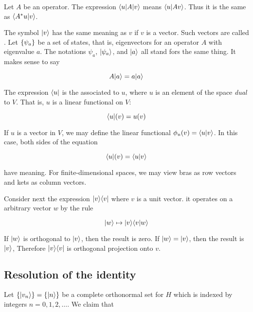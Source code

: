 Let $A$ be an operator.  The expression $\langle u | A | v \rangle$ means $\langle u | Av \rangle$.  Thus it is the same as $\langle A^*u | v \rangle$.  

The symbol $|v\rangle$ has the same meaning as $v$ if $v$ is a vector. Such vectors are called .  Let $\{ \psi_a \}$ be a set of states, that is, eigenvectors for an operator $A$ with eigenvalue $a$.  The notations $\psi_a$, $|\psi_a \rangle$, and  $|a\rangle$ all stand fors the same thing.  It makes sense to say

\begin{equation}
A|a\rangle = a|a\rangle
\end{equation}

The expression $\langle u |$ is the  associated to $u$, where $u$ is an element of the space \emph{dual} to $V$.  That is, $u$ is a linear functional on $V$:

\begin{equation}
\langle u |(v) = u(v)
\end{equation}

If $u$ is a vector in $V$, we may define the linear functional $\phi_u(v) = \langle u | v \rangle$.  In this case, both sides of the equation

\begin{equation}
\langle u |(v) = \langle u | v \rangle
\end{equation}

have meaning.  For finite-dimensional spaces, we may view bras as row vectors and kets as column vectors.

Consider next the expression $| v \rangle \langle v |$ where $v$ is a unit vector. it operates on a arbitrary vector $w$ by the rule

\begin{equation}
  | w \rangle \mapsto | v \rangle \langle v | w \rangle
\end{equation}

If $| w \rangle$ is orthogonal to $| v \rangle$, then the result is zero.  If $| w \rangle = | v \rangle$, then the result is $| v \rangle$, Therefore $| v \rangle \langle v |$ is orthogonal projection onto $v$.


\subsection{Resolution of the identity}

Let $\{ |v_n\rangle\} = \{ |n\rangle\}$ be a complete orthonormal set for $H$ which is indexed by integers $n = 0, 1, 2, \ldots$.  We claim that

